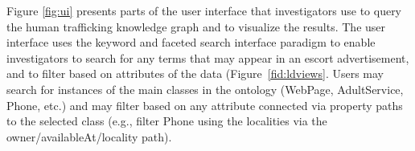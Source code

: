 Figure \ref{fig:ui} presents parts of the user interface that investigators use to query the human trafficking knowledge graph and to visualize the results.
The user interface uses the keyword and faceted search interface paradigm to enable investigators to search for any terms that may appear in an escort advertisement, and to filter based on attributes of the data (Figure~\ref{fid:ldviews}.
Users may search for instances of the main classes in the ontology (WebPage, AdultService, Phone, etc.) and may filter based on any attribute connected via property paths to the selected class (e.g., filter Phone using the localities via the owner/availableAt/locality path).